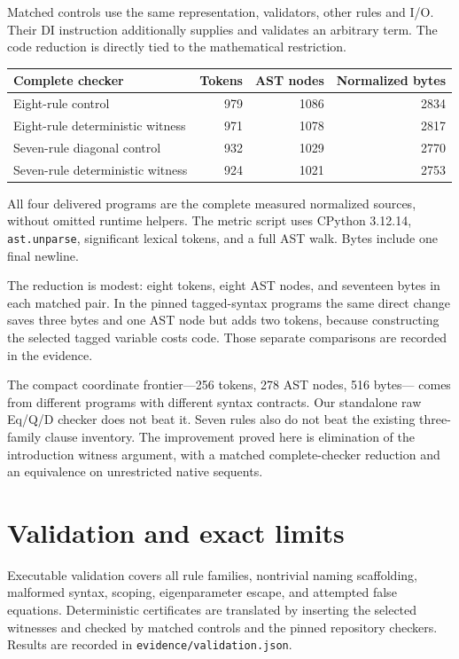 \documentclass[11pt]{article}
\begin{document}
Matched controls use the same representation, validators, other rules and
I/O. Their DI instruction additionally supplies and validates an arbitrary
term. The code reduction is directly tied to the mathematical restriction.

\begin{center}
\begin{tabular}{@{}lrrr@{}}
\toprule
Complete checker & Tokens & AST nodes & Normalized bytes\\
\midrule
Eight-rule control & 979 & 1086 & 2834\\
Eight-rule deterministic witness & 971 & 1078 & 2817\\
Seven-rule diagonal control & 932 & 1029 & 2770\\
Seven-rule deterministic witness & 924 & 1021 & 2753\\
\bottomrule
\end{tabular}
\end{center}

All four delivered programs are the complete measured normalized sources,
without omitted runtime helpers. The metric script uses CPython 3.12.14,
\texttt{ast.unparse}, significant lexical tokens, and a full AST walk.
Bytes include one final newline.

The reduction is modest: eight tokens, eight AST nodes, and seventeen bytes
in each matched pair. In the pinned tagged-syntax programs the same direct
change saves three bytes and one AST node but adds two tokens, because
constructing the selected tagged variable costs code.
Those separate comparisons are recorded in the evidence.

The compact coordinate frontier---256 tokens, 278 AST nodes, 516 bytes---
comes from different programs with different syntax contracts.
Our standalone raw Eq/Q/D checker does not beat it.
Seven rules also do not beat the existing three-family clause inventory.
The improvement proved here is elimination of the introduction witness
argument, with a matched complete-checker reduction and an equivalence on
unrestricted native sequents.

\section{Validation and exact limits}

Executable validation covers all rule families, nontrivial naming
scaffolding, malformed syntax, scoping, eigenparameter escape, and attempted
false equations. Deterministic certificates are translated by inserting
the selected witnesses and checked by matched controls and the pinned
repository checkers. Results are recorded in
\texttt{evidence/validation.json}.
\end{document}
